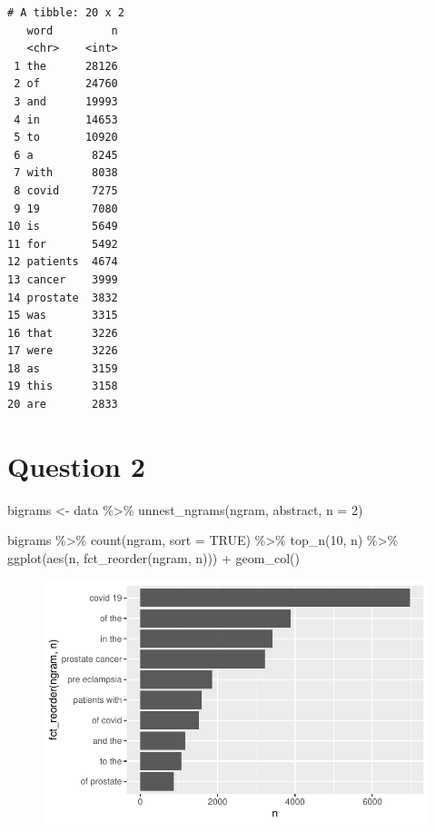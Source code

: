\documentclass[
  letterpaper,
  DIV=11,
  numbers=noendperiod]{scrartcl}
\newenvironment{Shaded}{\begin{snugshade}}{\end{snugshade}}
\newcommand{\AttributeTok}[1]{\textcolor[rgb]{0.40,0.45,0.13}{#1}}
\newcommand{\ConstantTok}[1]{\textcolor[rgb]{0.56,0.35,0.01}{#1}}
\newcommand{\DecValTok}[1]{\textcolor[rgb]{0.68,0.00,0.00}{#1}}
\newcommand{\FunctionTok}[1]{\textcolor[rgb]{0.28,0.35,0.67}{#1}}
\newcommand{\NormalTok}[1]{\textcolor[rgb]{0.00,0.23,0.31}{#1}}
\newcommand{\OtherTok}[1]{\textcolor[rgb]{0.00,0.23,0.31}{#1}}
\newcommand{\SpecialCharTok}[1]{\textcolor[rgb]{0.37,0.37,0.37}{#1}}
\begin{document}
\begin{verbatim}
# A tibble: 20 x 2
   word         n
   <chr>    <int>
 1 the      28126
 2 of       24760
 3 and      19993
 4 in       14653
 5 to       10920
 6 a         8245
 7 with      8038
 8 covid     7275
 9 19        7080
10 is        5649
11 for       5492
12 patients  4674
13 cancer    3999
14 prostate  3832
15 was       3315
16 that      3226
17 were      3226
18 as        3159
19 this      3158
20 are       2833
\end{verbatim}

\hypertarget{question-2}{%
\section{Question 2}\label{question-2}}

\begin{Shaded}
\begin{Highlighting}[]
\NormalTok{bigrams }\OtherTok{\textless{}{-}}\NormalTok{ data }\SpecialCharTok{\%\textgreater{}\%}
  \FunctionTok{unnest\_ngrams}\NormalTok{(ngram, abstract, }\AttributeTok{n =} \DecValTok{2}\NormalTok{) }

\NormalTok{bigrams }\SpecialCharTok{\%\textgreater{}\%}
  \FunctionTok{count}\NormalTok{(ngram, }\AttributeTok{sort =} \ConstantTok{TRUE}\NormalTok{) }\SpecialCharTok{\%\textgreater{}\%}
  \FunctionTok{top\_n}\NormalTok{(}\DecValTok{10}\NormalTok{, n) }\SpecialCharTok{\%\textgreater{}\%}
  \FunctionTok{ggplot}\NormalTok{(}\FunctionTok{aes}\NormalTok{(n, }\FunctionTok{fct\_reorder}\NormalTok{(ngram, n))) }\SpecialCharTok{+}
  \FunctionTok{geom\_col}\NormalTok{()}
\end{Highlighting}
\end{Shaded}

\begin{figure}[H]

{\centering \includegraphics{hw3_files/figure-pdf/unnamed-chunk-4-1.pdf}

}

\end{figure}
\end{document}
